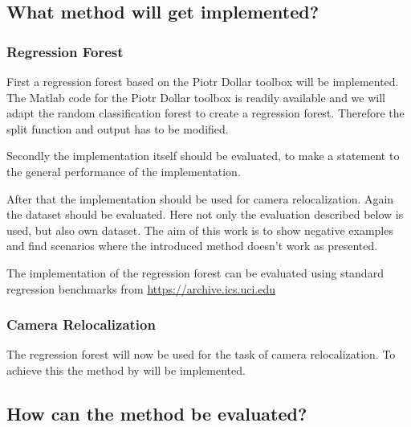 

\subsection{What method will get implemented?} %
\label{sub:what_method_will_get_implemented_}

\subsubsection*{Regression Forest} %
\label{ssub:regression_forest}

First a regression forest based on the Piotr Dollar toolbox \cite{piotr} will be implemented. The Matlab code for the Piotr Dollar toolbox is readily available and we will adapt the random classification forest to create a regression forest. Therefore the split function and output has to be modified.

Secondly the implementation itself should be evaluated, to make a statement to the general performance of the implementation.

After that the implementation should be used for camera relocalization. Again the dataset should be evaluated. Here not only the evaluation described below is used, but also own dataset. The aim of this work is to show negative examples and find scenarios where the introduced method \cite{shotton} doesn't work as presented.

The implementation of the regression forest can be evaluated using standard regression benchmarks from
\href{https://archive.ics.uci.edu/ml/datasets.html?format=&task=reg&att=&area=&numAtt=&numIns=&type=&sort=nameUp&view=table}{https://archive.ics.uci.edu}


\subsubsection{Camera Relocalization} %
\label{ssub:camera_relocalization}

The regression forest will now be used for the task of camera relocalization. To achieve this the method by \cite{shotton} will be implemented.



\subsection{How can the method be evaluated?} %
\label{sub:how_can_the_method_be_evaluated_}

